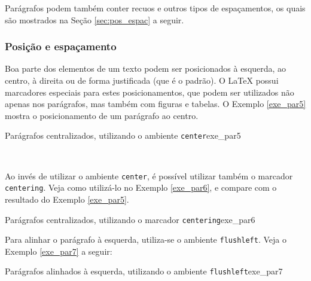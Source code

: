 
Parágrafos podem também conter recuos e outros tipos de espaçamentos, os quais são mostrados na Seção \ref{sec:pos_espac} a seguir.

\subsubsection*{Posição e espaçamento}
\label{sec:pos_espac}

Boa parte dos elementos de um texto podem ser posicionados à esquerda, ao centro, à direita ou de forma justificada (que é o padrão). O \LaTeX{} possui marcadores especiais para estes posicionamentos, que podem ser utilizados não apenas nos parágrafos, mas também com figuras e tabelas. O Exemplo \ref{exe_par5} mostra o posicionamento de um parágrafo ao centro.

\begin{texexptitled}[breakable,enhanced,middle=2mm]{Parágrafos centralizados, utilizando o ambiente \texttt{center}}{exe_par5}
\begin{center}
\lipsumsentence[9-10] \\ 
\lipsumsentence[11-12]
\end{center}
\end{texexptitled}

Ao invés de utilizar o ambiente \texttt{center}, é possível utilizar também o marcador \texttt{centering}. Veja como utilizá-lo no Exemplo \ref{exe_par6}, e compare com o resultado do Exemplo \ref{exe_par5}. 

\begin{texexptitled}[breakable,enhanced,middle=2mm]{Parágrafos centralizados, utilizando o marcador {\tt centering}}{exe_par6}
\centering
\lipsumsentence[9-10] \\ 
\lipsumsentence[11-12]
\end{texexptitled}

Para alinhar o parágrafo à esquerda, utiliza-se o ambiente {\tt flushleft}. Veja o Exemplo \ref{exe_par7} a seguir:

\begin{texexptitled}[breakable,enhanced,middle=2mm]{Parágrafos alinhados à esquerda, utilizando o ambiente {\tt flushleft}}{exe_par7}
\begin{flushleft}
\lipsumsentence[9-10] \\ 
\lipsumsentence[11-12]
\end{flushleft}
\end{texexptitled}

